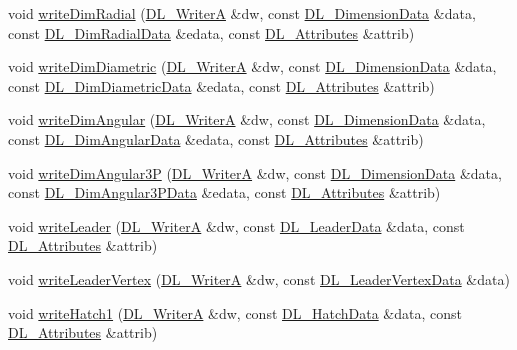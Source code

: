 \begin{DoxyCompactItemize}
\item 
void \hyperlink{classDL__Jww_a63c86960d29f01c47acc8a86c9b5779e}{write\-Dim\-Radial} (\hyperlink{classDL__WriterA}{D\-L\-\_\-\-Writer\-A} \&dw, const \hyperlink{structDL__DimensionData}{D\-L\-\_\-\-Dimension\-Data} \&data, const \hyperlink{structDL__DimRadialData}{D\-L\-\_\-\-Dim\-Radial\-Data} \&edata, const \hyperlink{classDL__Attributes}{D\-L\-\_\-\-Attributes} \&attrib)
\item 
void \hyperlink{classDL__Jww_a57e1bd75c5f9044b320a6731f45a30f6}{write\-Dim\-Diametric} (\hyperlink{classDL__WriterA}{D\-L\-\_\-\-Writer\-A} \&dw, const \hyperlink{structDL__DimensionData}{D\-L\-\_\-\-Dimension\-Data} \&data, const \hyperlink{structDL__DimDiametricData}{D\-L\-\_\-\-Dim\-Diametric\-Data} \&edata, const \hyperlink{classDL__Attributes}{D\-L\-\_\-\-Attributes} \&attrib)
\item 
void \hyperlink{classDL__Jww_a562f795baba64bb1de43e5dc79db3482}{write\-Dim\-Angular} (\hyperlink{classDL__WriterA}{D\-L\-\_\-\-Writer\-A} \&dw, const \hyperlink{structDL__DimensionData}{D\-L\-\_\-\-Dimension\-Data} \&data, const \hyperlink{structDL__DimAngularData}{D\-L\-\_\-\-Dim\-Angular\-Data} \&edata, const \hyperlink{classDL__Attributes}{D\-L\-\_\-\-Attributes} \&attrib)
\item 
void \hyperlink{classDL__Jww_a9ce2b1d96a5306504cd786acf5cf38bf}{write\-Dim\-Angular3\-P} (\hyperlink{classDL__WriterA}{D\-L\-\_\-\-Writer\-A} \&dw, const \hyperlink{structDL__DimensionData}{D\-L\-\_\-\-Dimension\-Data} \&data, const \hyperlink{structDL__DimAngular3PData}{D\-L\-\_\-\-Dim\-Angular3\-P\-Data} \&edata, const \hyperlink{classDL__Attributes}{D\-L\-\_\-\-Attributes} \&attrib)
\item 
void \hyperlink{classDL__Jww_a2f48871dce3ce0424172212f7ff2a798}{write\-Leader} (\hyperlink{classDL__WriterA}{D\-L\-\_\-\-Writer\-A} \&dw, const \hyperlink{structDL__LeaderData}{D\-L\-\_\-\-Leader\-Data} \&data, const \hyperlink{classDL__Attributes}{D\-L\-\_\-\-Attributes} \&attrib)
\item 
void \hyperlink{classDL__Jww_a3d15752d4c1d8178052b0cbf25b84296}{write\-Leader\-Vertex} (\hyperlink{classDL__WriterA}{D\-L\-\_\-\-Writer\-A} \&dw, const \hyperlink{structDL__LeaderVertexData}{D\-L\-\_\-\-Leader\-Vertex\-Data} \&data)
\item 
void \hyperlink{classDL__Jww_a18fd5b69d891dc78605ba2ff1ed926d4}{write\-Hatch1} (\hyperlink{classDL__WriterA}{D\-L\-\_\-\-Writer\-A} \&dw, const \hyperlink{structDL__HatchData}{D\-L\-\_\-\-Hatch\-Data} \&data, const \hyperlink{classDL__Attributes}{D\-L\-\_\-\-Attributes} \&attrib)

\end{DoxyCompactItemize}
